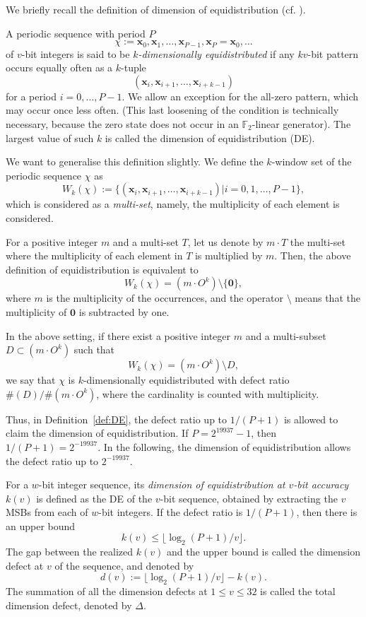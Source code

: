 \documentclass[acmnow]{acmtrans2m}
\def\F2{{\mathbb F}_2}
\def\bx{{{\mathbf x}}}
\begin{document}
We briefly recall the definition of dimension of 
equidistribution (cf. \cite{CLT}). 
\begin{definition}\label{def:DE}
A periodic sequence with period $P$
$$\chi:=\bx_0, \bx_1, \ldots, \bx_{P-1}, \bx_P=\bx_0, \ldots$$
of $v$-bit integers is said to be {\em $k$-dimensionally equidistributed}
if any $kv$-bit pattern occurs equally often as a $k$-tuple
$$
(\bx_i, \bx_{i+1}, \ldots, \bx_{i+k-1})
$$
for a period $i=0,\ldots, P-1$.
We allow an exception for 
the all-zero pattern, which may occur once less often.
(This last loosening of the condition is technically
necessary, because the zero state does not occur
in an $\F2$-linear generator). 
The largest value of such $k$ is called the dimension 
of equidistribution (DE).
\end{definition}

We want to generalise this definition slightly.
We define the $k$-window set of the periodic sequence $\chi$
as
$$
W_k(\chi):=
\{(\bx_i, \bx_{i+1}, \ldots, \bx_{i+k-1}) | 
i =0,1,\ldots, P-1\},
$$
which is considered as a {\em multi-set}, namely, 
the multiplicity of each element is considered. 

For a positive integer $m$ and a multi-set $T$,
let us denote by $m \cdot T$ the multi-set 
where the multiplicity of each element in $T$ is
multiplied by $m$. Then, the above definition of
equidistribution is equivalent to 
$$
W_k(\chi)=(m\cdot O^k) \setminus \{{\mathbf 0}\},
$$
where $m$ is the multiplicity of the occurrences,
and the operator $\setminus$ means that the multiplicity
of ${\mathbf 0}$ is subtracted by one. 

\begin{definition}
In the above setting, if there exist a positive integer $m$ 
and a multi-subset
$D \subset (m\cdot O^k)$
such that
$$
W_k(\chi)=(m\cdot O^k) \setminus D,
$$
we say that $\chi$ is $k$-dimensionally equidistributed 
with defect ratio $\#(D)/\#(m \cdot O^k)$, 
where the cardinality is counted with multiplicity. 
\end{definition}
Thus, in Definition~\ref{def:DE}, the defect ratio up to $1/(P+1)$
is allowed to claim the dimension of equidistribution.
If $P=2^{19937}-1$, then $1/(P+1)=2^{-19937}$. 
In the following, the dimension of equidistribution 
allows the defect ratio up to $2^{-19937}$. 

For a $w$-bit integer sequence, its {\em dimension of 
equidistribution at $v$-bit accuracy} $k(v)$
is defined as the DE of the $v$-bit sequence, obtained by extracting
the $v$ MSBs from each of $w$-bit integers.
If the defect ratio is $1/(P+1)$, 
then there is an upper bound 
$$
k(v) \leq \lfloor \log_2 (P+1) / v \rfloor.
$$
The gap between the realized $k(v)$ and the upper bound is
called the dimension defect at $v$ of the sequence,
and denoted by
$$
d(v):=\lfloor \log_2 (P+1) / v \rfloor -k(v).
$$
The summation of all the dimension defects at
$1 \leq v \leq 32$ is called the total dimension defect, 
denoted by $\Delta$.
\end{document}
